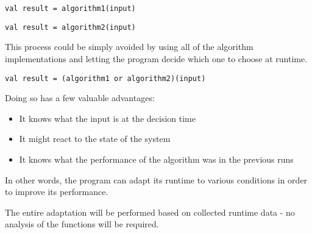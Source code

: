\lstset{style=Scala}
\begin{lstlisting}
val result = algorithm1(input)
\end{lstlisting}

\lstset{style=Scala}
\begin{lstlisting}
val result = algorithm2(input)
\end{lstlisting}

This process could be simply avoided by using all of the algorithm implementations and letting the program decide which one to choose at runtime.

\lstset{style=Scala}
\begin{lstlisting}
val result = (algorithm1 or algorithm2)(input)
\end{lstlisting}

Doing so has a few valuable advantages:
\begin{itemize}
	\item It knows what the input is at the decision time
	\item It might react to the state of the system
	\item It knows what the performance of the algorithm was in the previous runs
\end{itemize}

In other words, the program can adapt its runtime to various conditions in order to improve its performance.

The entire adaptation will be performed based on collected runtime data - no analysis of the functions will be required.

